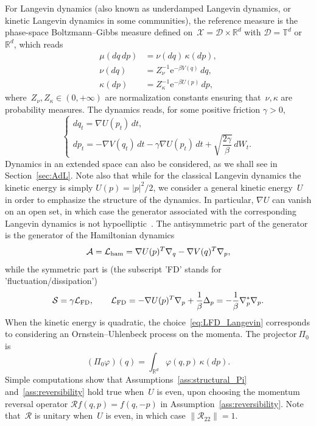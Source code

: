 \documentclass[10pt]{amsart}
\theoremstyle{definition}\newtheorem{defi}[theo]{Definition}\newtheorem{rema}[theo]{Remark}\newtheorem{exam}[theo]{Example}\newtheorem{exem}[theo]{Example}\newtheorem{nota}[theo]{Notation}
\newcommand{\rme}{\mathrm{e}}
\newcommand{\cLs}{\mathcal{S}}
\newcommand{\cLa}{\mathcal{A}}
\newcommand{\cX}{\mathcal{X}}
\newcommand{\cD}{\mathcal{D}}
\newcommand{\cR}{\mathcal{R}}
\newcommand{\R}{\mathbb{R}}
\newcommand{\bbT}{\mathbb{T}}
\newcommand{\cLham}{\mathcal{L}_{\rm ham}}
\newcommand{\cLFD}{\mathcal{L}_{\rm FD}}
\begin{document}
For Langevin dynamics (also known as underdamped Langevin dynamics, or kinetic Langevin dynamics in some communities), the reference measure is the phase-space Boltzmann--Gibbs measure defined on~$\cX = \cD \times \R^d$ with $\cD = \bbT^d$ or~$\R^d$, which reads
\begin{equation}\label{eq:canonical_U_V}
\begin{split}
\mu(dq\,dp) &= \nu(dq)\,\kappa(dp), \\
 \nu(dq) &= Z_\nu^{-1} \rme^{-\beta V(q)} \,dq, \\\kappa(dp)&= Z_\kappa^{-1} \rme^{-\beta U(p)} \,dp,
\end{split}
\end{equation}
where~$Z_\nu,Z_\kappa \in (0,+\infty)$ are normalization constants ensuring that~$\nu,\kappa$ are probability measures. The dynamics reads, for some positive friction $\gamma > 0$,
\[
\begin{cases}
dq_t  = \nabla U(p_t) \, dt, \\
dp_t  = -\nabla V(q_t) \, dt - \gamma \nabla U(p_t) \, dt + \sqrt{\dfrac{2\gamma}{\beta}} \, dW_t.
\end{cases}
\]
Dynamics in an extended space can also be considered, as we shall see in Section~\ref{sec:AdL}. Note also that while for the classical Langevin dynamics the kinetic energy is simply $U(p) = |p|^2/2$, we consider a general kinetic energy~$U$ in order to emphasize the structure of the dynamics. In particular, $\nabla U$ can vanish on an open set, in which case the generator associated with the corresponding Langevin dynamics is not hypoelliptic~\cite{ST18}. The antisymmetric part of the generator is the generator of the Hamiltonian dynamics
\begin{equation}\label{eq:Lham}
\cLa = \cLham = \nabla U(p)^T \nabla_q - \nabla V(q)^T \nabla_p,
\end{equation}
while the symmetric part is (the subscript 'FD' stands for 'fluctuation/dissipation')
\begin{equation}\label{eq:LFD_Langevin}
\cLs = \gamma \cLFD,
\qquad
\cLFD = -\nabla U(p)^T \nabla_p + \frac1\beta \Delta_p = -\frac1\beta \nabla_p^* \nabla_p.
\end{equation}
When the kinetic energy is quadratic, the choice~\eqref{eq:LFD_Langevin} corresponds to considering an Ornstein--Uhlenbeck process on the momenta. The projector$~\Pi_0$ is
\begin{equation}\label{eq:def_Pi}
(\Pi_0 \varphi)(q) = \int_{\R^d} \varphi(q,p)\, \kappa(dp).
\end{equation}
Simple computations show that Assumptions~\ref{ass:structural_Pi} and~\ref{ass:reversibility} hold true when~$U$ is even, upon choosing the momentum reversal operator $\cR f(q, p) = f(q, -p)$ in Assumption~\ref{ass:reversibility}. Note that~$\cR$ is unitary when~$U$ is even, in which case $\|\cR_{22}\| = 1$.
\end{document}
